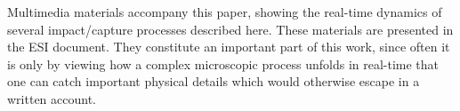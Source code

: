 		Multimedia materials accompany this paper, showing the real-time dynamics of several impact/capture processes described here. These materials are presented in the ESI document. They constitute an important part of this work, since often it is only by viewing how a complex microscopic process unfolds in real-time that one can catch important physical details which would otherwise escape in a written account.